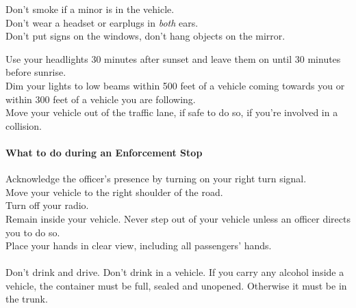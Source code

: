 Don't smoke if a minor is in the vehicle.\\
Don't wear a headset or earplugs in \emph{both} ears.\\
Don't put signs on the windows, don't hang objects on the mirror.

Use your headlights 30 minutes after sunset and leave them on
until 30 minutes before sunrise.\\
Dim your lights to low beams within 500 feet of a vehicle coming towards you
or within 300 feet of a vehicle you are following.\\
Move your vehicle out of the traffic lane, if safe to do so,
if you're involved in a collision.

\paragraph{What to do during an Enforcement Stop}
Acknowledge the officer's presence by turning on your right turn signal.\\
Move your vehicle to the right shoulder of the road.\\
Turn off your radio.\\
Remain inside your vehicle.
Never step out of your vehicle unless an officer directs you to do so.\\
Place your hands in clear view, including all passengers' hands.

\paragraph{}
Don't drink and drive. Don't drink in a vehicle.
If you carry any alcohol inside a vehicle, the container must be full,
sealed and unopened.
Otherwise it must be in the trunk.
